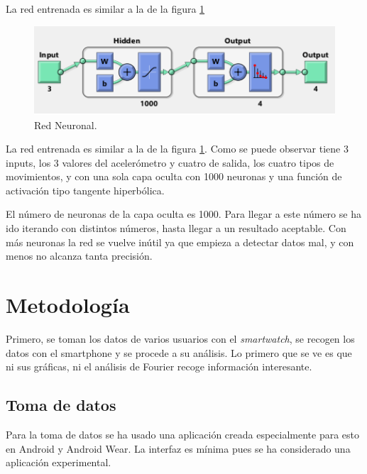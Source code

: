 \documentclass[12pt]{article}
\numberwithin{equation}{section}
\begin{document}
{La red entrenada es similar a la de la figura \ref{fig:redneuronal}

\begin{figure}[h]
    \centering
    \includegraphics[width=1\textwidth]{redneuronal.png}
    \caption{Red Neuronal.}
    \label{fig:redneuronal}
\end{figure}

La red entrenada es similar a la de la figura \ref{fig:redneuronal}. Como se puede observar tiene 3 inputs, los 3 valores del acelerómetro y cuatro de salida, los cuatro tipos de movimientos, y con una sola capa oculta con 1000 neuronas y una función de activación tipo tangente hiperbólica.

El número de neuronas de la capa oculta es 1000. Para llegar a este número se ha ido iterando con distintos números, hasta llegar a un resultado aceptable. Con más neuronas la red se vuelve inútil ya que empieza a detectar datos mal, y con menos no alcanza tanta precisión.


\newpage
\section{Metodología}
Primero, se toman los datos de varios usuarios con el \textit{smartwatch}, se recogen los datos con el smartphone y se procede a su análisis. Lo primero que se ve es que ni sus gráficas, ni el análisis de Fourier recoge información interesante.

\subsection{Toma de datos}

Para la toma de datos se ha usado una aplicación creada especialmente para esto en Android y Android Wear. La interfaz es mínima pues se ha considerado una aplicación experimental.

}
\end{document}

